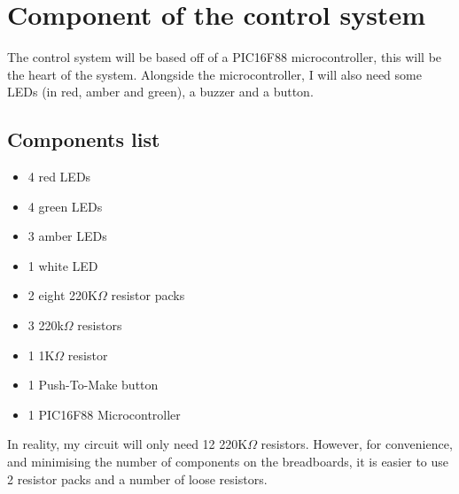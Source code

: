 \section{Component of the control system}
The control system will be based off of a PIC16F88 microcontroller, this will be the heart of the system. Alongside the microcontroller, I will also need some LEDs (in red, amber and green), a buzzer and a button.
\subsection{Components list}
\begin{itemize}
    \item 4 red LEDs
    \item 4 green LEDs
    \item 3 amber LEDs
    \item 1 white LED
    \item 2 eight 220K$\Omega$ resistor packs
    \item 3 220k$\Omega$ resistors
    \item 1 1K$\Omega$ resistor
    \item 1 Push-To-Make button
    \item 1 PIC16F88 Microcontroller
\end{itemize}
In reality, my circuit will only need 12 220K$\Omega$ resistors. However, for convenience, and minimising the number of components on the breadboards, it is easier to use 2 resistor packs and a number of loose resistors.


